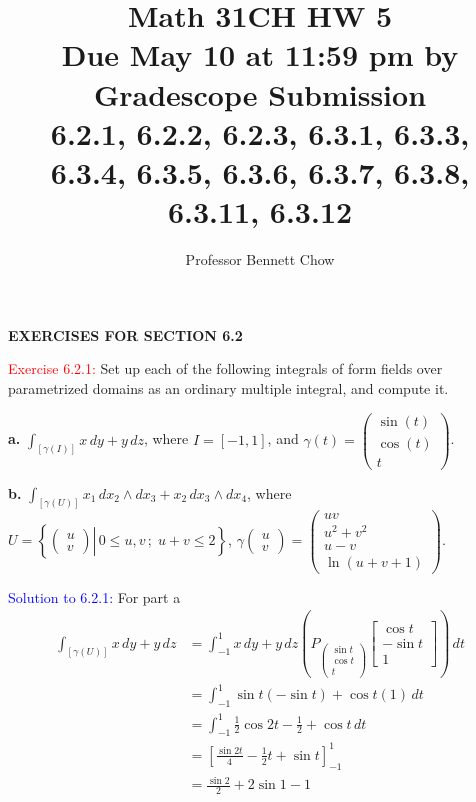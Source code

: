 \documentclass[12pt]{article}
\title{Math 31CH HW 5\\ Due May 10 at 11:59 pm by Gradescope Submission\\
6.2.1, 6.2.2, 6.2.3, 6.3.1, 6.3.3, 6.3.4, 6.3.5, 6.3.6, 6.3.7, 6.3.8, 6.3.11, 6.3.12}
\author{Professor Bennett Chow}
\date{}
\begin{document}
\maketitle


\begin{center}
   \textbf{EXERCISES FOR SECTION 6.2}
\end{center}

\textcolor{red}{Exercise 6.2.1:}
Set up each of the following integrals of form fields over parametrized domains as an ordinary multiple integral, and compute it.

\textbf{a.} $\displaystyle \int_{[\gamma(I)]} x \, dy + y \, dz$,
where $I=[-1,1]$, and $\displaystyle \gamma(t) = \begin{pmatrix} \sin (t) \\ \cos (t) \\ t \end{pmatrix}$.

\textbf{b.} $\int_{[\gamma(U)]} x_1\, dx_2 \wedge dx_3 + x_2\, dx_3 \wedge dx_4$, where
$\displaystyle U = \left\{ \left. \begin{pmatrix} u \\ v \end{pmatrix} \right| \, 0\leq u, v\,; \; u+ v \leq 2 \right\}$,
$\gamma \begin{pmatrix} u \\ v \end{pmatrix} =\begin{pmatrix} uv \\ u^2+v^2 \\ u-v \\ \ln(u+v+1) \end{pmatrix}$.
\smallskip

\textcolor{blue}{Solution to 6.2.1:}
For part a
\begin{align*}
    \int_{[\gamma(U)]} x \,dy + y \,dz
    &= \int_{-1}^1 x \,dy + y \,dz
        \left(P_{\begin{pmatrix} \sin t \\ \cos t \\ t \end{pmatrix}}
            \begin{bmatrix}
                \cos t \\ -\sin t \\ 1
            \end{bmatrix}
        \right) \,dt \\ 
    &= \int_{-1}^1 \sin t (-\sin t) + \cos t (1) \,dt \\
    &= \int_{-1}^1 \frac{1}{2}\cos 2t - \frac{1}{2} + \cos t \,dt\\
    &= \left[\frac{\sin 2t}{4} - \frac{1}{2}t + \sin t \right]_{-1}^{1} \\
    &= \frac{\sin 2}{2} + 2\sin 1 - 1
\end{align*}
\end{document}
